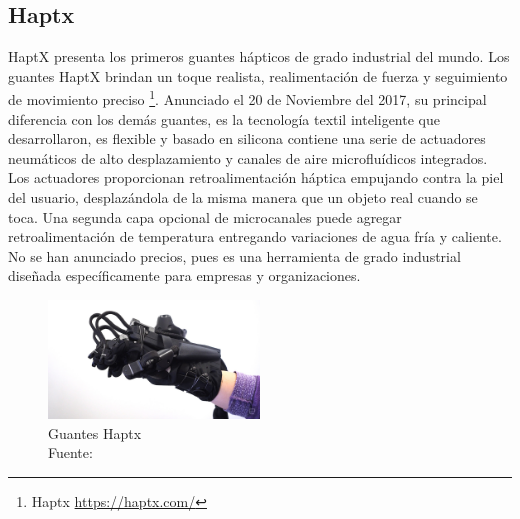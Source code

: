 \subsection{Haptx}
HaptX presenta los primeros guantes hápticos de grado industrial del mundo. Los guantes HaptX brindan un toque realista, realimentación de fuerza y seguimiento de movimiento preciso \footnote{ Haptx \url{https://haptx.com/}}. Anunciado el 20 de Noviembre del 2017, su principal diferencia con los demás guantes, es la tecnología textil inteligente que desarrollaron, es flexible y basado en silicona contiene una serie de actuadores neumáticos de alto desplazamiento y canales de aire microfluídicos integrados. Los actuadores proporcionan retroalimentación háptica empujando contra la piel del usuario, desplazándola de la misma manera que un objeto real cuando se toca. Una segunda capa opcional de microcanales puede agregar retroalimentación de temperatura entregando variaciones de agua fría y caliente. No se han anunciado precios, pues es una herramienta de grado industrial diseñada específicamente para empresas y organizaciones.

\begin{figure}[H]
  \begin{center} 
   	\includegraphics[width=0.5\textwidth]{images/chapter02/haptx01.jpg} 
    \caption[Guantes Haptx]{Guantes Haptx \\Fuente: \cite{haptx-info-page}} 
    \label{fig:haptx}
  \end{center}
\end{figure}



